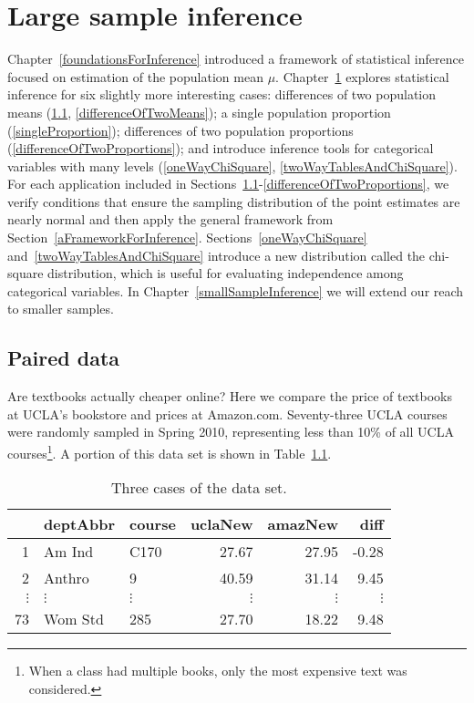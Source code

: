 
\chapter{Large sample inference}
\label{largeSampleInference}

Chapter~\ref{foundationsForInference} introduced a framework of statistical inference focused on estimation of the population mean $\mu$. Chapter~\ref{largeSampleInference} explores statistical inference for six slightly more interesting cases: differences of two population means (\ref{pairedData}, \ref{differenceOfTwoMeans}); a single population proportion (\ref{singleProportion}); differences of two population proportions (\ref{differenceOfTwoProportions}); and introduce inference tools for categorical variables with many levels (\ref{oneWayChiSquare}, \ref{twoWayTablesAndChiSquare}). For each application included in Sections~\ref{pairedData}-\ref{differenceOfTwoProportions}, we verify conditions that ensure the sampling distribution of the point estimates are nearly normal and then apply the general framework from Section~\ref{aFrameworkForInference}. Sections~\ref{oneWayChiSquare} and~\ref{twoWayTablesAndChiSquare} introduce a new distribution called the chi-square distribution, which is useful for evaluating independence among categorical variables. In Chapter~\ref{smallSampleInference} we will extend our reach to smaller samples.

\section{Paired data}
\label{pairedData}

Are textbooks actually cheaper online? Here we compare the price of textbooks at UCLA's bookstore and prices at Amazon.com. Seventy-three UCLA courses were randomly sampled in Spring 2010, representing less than 10\% of all UCLA courses\footnote{When a class had multiple books, only the most expensive text was considered.}. A portion of this  data set is shown in Table~\ref{textbooksDF}. \vspace{2.5mm}

\begin{table}[h]
\centering
\begin{tabular}{rllrrr}
  \hline
 & deptAbbr & course & uclaNew & amazNew & diff \\ 
  \hline
1 & Am Ind &  C170 & 27.67 & 27.95 & -0.28 \\ 
  2 & Anthro & 9 & 40.59 & 31.14 & 9.45 \\ 
$\vdots$ & $\vdots$ & $\vdots$ & $\vdots$ & $\vdots$ & $\vdots$ \\
  73 & Wom Std & 285 & 27.70 & 18.22 & 9.48 \\ 
   \hline
\end{tabular}
\caption{Three cases of the  data set.}
\label{textbooksDF}
\end{table}\vspace{-2.5mm}

